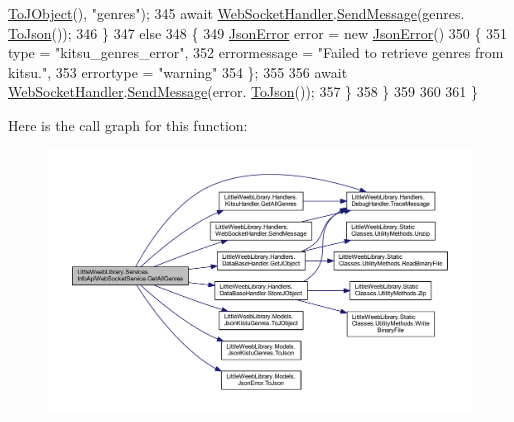 \begin{DoxyCode}
      \mbox{\hyperlink{class_little_weeb_library_1_1_models_1_1_json_kistu_genres_a0cce3f3f712276fbae17ef4d99ec6fad}{ToJObject}}(), \textcolor{stringliteral}{"genres"});
345                     await \mbox{\hyperlink{class_little_weeb_library_1_1_handlers_1_1_web_socket_handler}{WebSocketHandler}}.\mbox{\hyperlink{class_little_weeb_library_1_1_handlers_1_1_web_socket_handler_a1de289d54d665a32c93478c68d3e6ad0}{SendMessage}}(genres.
      \mbox{\hyperlink{class_little_weeb_library_1_1_models_1_1_json_kistu_genres_aad51f41f73ee3bb3f21196e721af3658}{ToJson}}());
346                 \}
347                 \textcolor{keywordflow}{else}
348                 \{
349                     \mbox{\hyperlink{class_little_weeb_library_1_1_models_1_1_json_error}{JsonError}} error = \textcolor{keyword}{new} \mbox{\hyperlink{class_little_weeb_library_1_1_models_1_1_json_error}{JsonError}}()
350                     \{
351                         type = \textcolor{stringliteral}{"kitsu\_genres\_error"},
352                         errormessage = \textcolor{stringliteral}{"Failed to retrieve genres from kitsu."},
353                         errortype = \textcolor{stringliteral}{"warning"}
354                     \};
355 
356                     await \mbox{\hyperlink{class_little_weeb_library_1_1_handlers_1_1_web_socket_handler}{WebSocketHandler}}.\mbox{\hyperlink{class_little_weeb_library_1_1_handlers_1_1_web_socket_handler_a1de289d54d665a32c93478c68d3e6ad0}{SendMessage}}(error.
      \mbox{\hyperlink{class_little_weeb_library_1_1_models_1_1_json_error_a0e3e7dd2e2990404b7f0461742b23440}{ToJson}}());
357                 \}
358             \}
359 
360            
361         \}
\end{DoxyCode}
Here is the call graph for this function\+:\nopagebreak
\begin{figure}[H]
\begin{center}
\leavevmode
\includegraphics[width=350pt]{class_little_weeb_library_1_1_services_1_1_info_api_web_socket_service_a2882975741be27c69b461509d48e2636_cgraph}
\end{center}
\end{figure}
